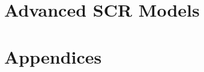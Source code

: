 \documentclass{book}
\begin{document}





\part{Advanced SCR Models}
















\part{Appendices}









\end{document}
